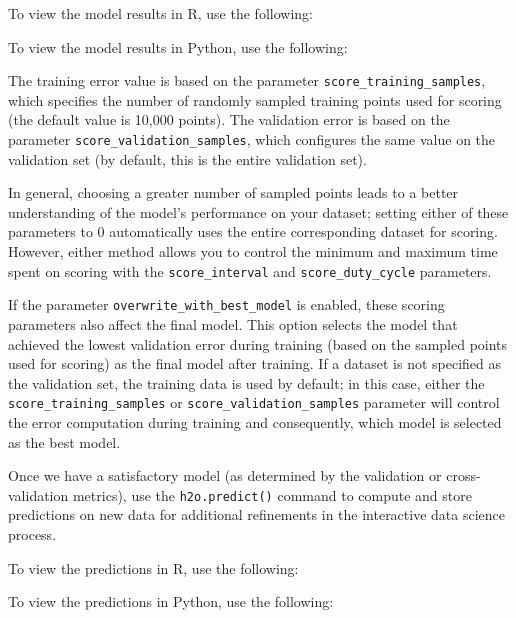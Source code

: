 {{\waterExampleInR
To view the model results in R, use the following: 


\newpage
\waterExampleInPython
To view the model results in Python, use the following: 



\noindent
The training error value is based on the parameter \texttt{score\_training\_samples}, which specifies the number of randomly sampled training points used for scoring (the default value is 10,000 points). The validation error is based on the parameter \texttt{score\_validation\_samples}, which configures the same value on the validation set (by default, this is the entire validation set).

In general, choosing a greater number of sampled points leads to a better understanding of the model's performance on your dataset; setting either of these parameters to 0 automatically uses the entire corresponding dataset for scoring. However, either method allows you to control the minimum and maximum time spent on scoring with the \texttt{score\_interval} and \texttt{score\_duty\_cycle} parameters.

If the parameter \texttt{overwrite\_with\_best\_model} is enabled, these scoring parameters also affect the final model. This option selects the model that achieved the lowest validation error during training (based on the sampled points used for scoring) as the final model after training. If a dataset is not specified as the validation set, the training data is used by default; in this case, either the \texttt{score\_training\_samples} or \texttt{score\_validation\_samples} parameter will control the error computation during training and consequently, which model is selected as the best model.

Once we have a satisfactory model (as determined by the validation or cross-validation metrics), use the \texttt{h2o.predict()} command to compute and store predictions on new data for additional refinements in the interactive data science process.

\waterExampleInR
To view the predictions in R, use the following: 


\waterExampleInPython
To view the predictions in Python, use the following: 


}}
